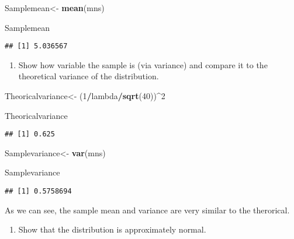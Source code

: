 \documentclass[]{article}
\newenvironment{Shaded}{\begin{snugshade}}{\end{snugshade}}
\newcommand{\DecValTok}[1]{\textcolor[rgb]{0.00,0.00,0.81}{#1}}
\newcommand{\KeywordTok}[1]{\textcolor[rgb]{0.13,0.29,0.53}{\textbf{#1}}}
\newcommand{\NormalTok}[1]{#1}
\newcommand{\OperatorTok}[1]{\textcolor[rgb]{0.81,0.36,0.00}{\textbf{#1}}}
\newcommand{\StringTok}[1]{\textcolor[rgb]{0.31,0.60,0.02}{#1}}
\providecommand{\tightlist}{%
  \setlength{\itemsep}{0pt}\setlength{\parskip}{0pt}}
\begin{document}
\begin{Shaded}
\begin{Highlighting}[]
\NormalTok{Samplemean<-}\StringTok{ }\KeywordTok{mean}\NormalTok{(mns)}

\NormalTok{Samplemean}
\end{Highlighting}
\end{Shaded}

\begin{verbatim}
## [1] 5.036567
\end{verbatim}

\begin{enumerate}
\def\labelenumi{\arabic{enumi}.}
\setcounter{enumi}{1}
\tightlist
\item
  Show how variable the sample is (via variance) and compare it to the
  theoretical variance of the distribution.
\end{enumerate}

\begin{Shaded}
\begin{Highlighting}[]
\NormalTok{Theoricalvariance<-}\StringTok{ }\NormalTok{(}\DecValTok{1}\OperatorTok{/}\NormalTok{lambda}\OperatorTok{/}\KeywordTok{sqrt}\NormalTok{(}\DecValTok{40}\NormalTok{))}\OperatorTok{^}\DecValTok{2}

\NormalTok{Theoricalvariance}
\end{Highlighting}
\end{Shaded}

\begin{verbatim}
## [1] 0.625
\end{verbatim}

\begin{Shaded}
\begin{Highlighting}[]
\NormalTok{Samplevariance<-}\StringTok{ }\KeywordTok{var}\NormalTok{(mns)}

\NormalTok{Samplevariance}
\end{Highlighting}
\end{Shaded}

\begin{verbatim}
## [1] 0.5758694
\end{verbatim}

As we can see, the sample mean and variance are very similar to the
therorical.

\begin{enumerate}
\def\labelenumi{\arabic{enumi}.}
\setcounter{enumi}{2}
\tightlist
\item
  Show that the distribution is approximately normal.
\end{enumerate}
\end{document}
